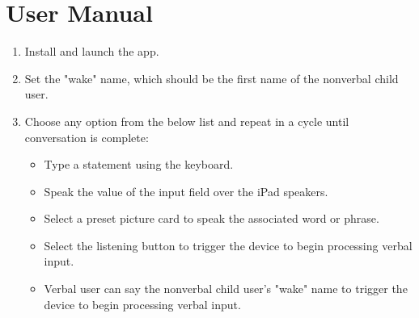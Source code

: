 \chapter{User Manual}

\begin{enumerate}
\item Install and launch the app.
\item Set the "wake" name, which should be the first name of the nonverbal child user.
\item Choose any option from the below list and repeat in a cycle until conversation is complete:
\begin{itemize}
\item Type a statement using the keyboard.
\item Speak the value of the input field over the iPad speakers.
\item Select a preset picture card to speak the associated word or phrase.
\item Select the listening button to trigger the device to begin processing verbal input.
\item Verbal user can say the nonverbal child user's "wake" name to trigger the device to begin processing verbal input.
\end{itemize}
\end{enumerate}